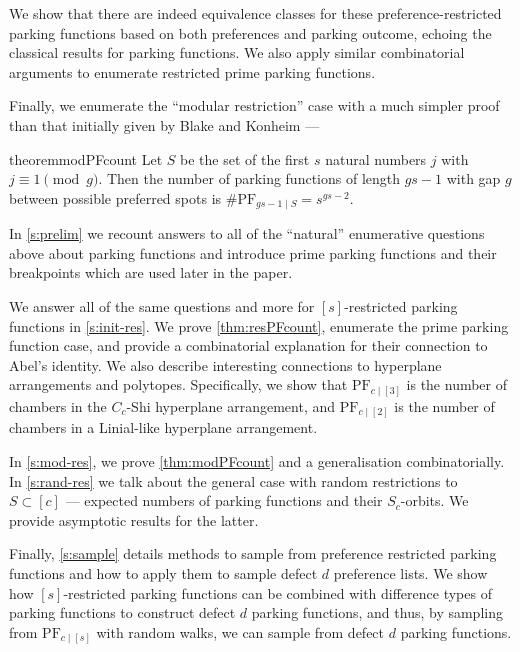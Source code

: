 \documentclass[12 pt]{amsart}
\theoremstyle{definition} %
\theoremstyle{remark} %
\begin{document}
We show that there are indeed equivalence classes for these preference-restricted parking functions based on both preferences and parking outcome, echoing the classical results for parking functions. We also apply similar combinatorial arguments to enumerate restricted prime parking functions.

Finally, we enumerate the ``modular restriction'' case with a much simpler proof than that initially given by Blake and Konheim \cite{blake-konheim-1977} ---

\begin{restatable}{theorem}{modPFcount}
	\label{thm:modPFcount}
	Let $S$ be the set of the first $s$ natural numbers $j$ with $j \equiv 1 \pmod g$. Then the number of parking functions of length $gs - 1$ with gap $g$ between possible preferred spots is $\# \mathrm{PF}_{gs - 1 \mid S} = s^{g s - 2}$.
\end{restatable}

In \cref{s:prelim} we recount answers to all of the ``natural'' enumerative questions above about parking functions and introduce prime parking functions and their breakpoints which are used later in the paper.

We answer all of the same questions and more for $[s]$-restricted parking functions in \cref{s:init-res}. We prove \cref{thm:resPFcount}, enumerate the prime parking function case, and provide a combinatorial explanation for their connection to Abel's identity. We also describe interesting connections to hyperplane arrangements and polytopes. Specifically, we show that $\mathrm{PF}_{c \mid [3]}$ is the number of chambers in the $C_{c}$-Shi hyperplane arrangement, and $\mathrm{PF}_{c \mid [2]}$ is the number of chambers in a Linial-like hyperplane arrangement. 

In \cref{s:mod-res}, we prove \cref{thm:modPFcount} and a generalisation combinatorially. In \cref{s:rand-res} we talk about the general case with random restrictions to $S \subset [c]$ --- expected numbers of parking functions and their $S_{c}$-orbits. We provide asymptotic results for the latter.

Finally, \cref{s:sample} details methods to sample from preference restricted parking functions and how to apply them to sample defect $d$ preference lists. We show how $[s]$-restricted parking functions can be combined with difference types of parking functions to construct defect $d$ parking functions, and thus, by sampling from $\mathrm{PF}_{c \mid [s]}$ with random walks, we can sample from defect $d$ parking functions.
       
\end{document}
